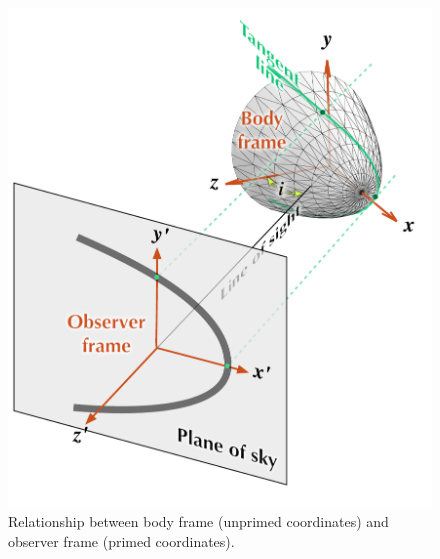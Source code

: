 \begin{figure}
  \centering
  \includegraphics[width=\linewidth]{figs/projection-pos}
  \caption{Relationship between body frame (unprimed coordinates) and
    observer frame (primed coordinates).}
  \label{fig:projection-pos}
\end{figure}





